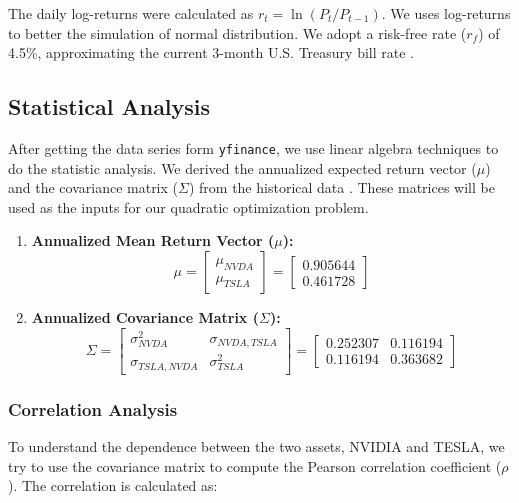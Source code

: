 \documentclass[12pt]{article}
\begin{document}
The daily log-returns were calculated as $r_t = \ln(P_t / P_{t-1})$. We uses log-returns to better the simulation of normal distribution. We adopt a risk-free rate ($r_f$) of 4.5\%, approximating the current 3-month U.S. Treasury bill rate \cite{treasury2025}.

\subsection{Statistical Analysis}
After getting the data series form \texttt{yfinance}, we use linear algebra techniques to do the statistic analysis. We derived the annualized expected return vector ($\mu$) and the covariance matrix ($\Sigma$) from the historical data \cite{strang2016}. These matrices will be used as the inputs for our quadratic optimization problem.

\begin{enumerate}
    \item \textbf{Annualized Mean Return Vector ($\mu$):}
    \[
    \mu = 
    \begin{bmatrix}
    \mu_{NVDA} \\
    \mu_{TSLA}
    \end{bmatrix}
    =
    \begin{bmatrix}
    0.905644 \\
    0.461728
    \end{bmatrix}
    \]

    \item \textbf{Annualized Covariance Matrix ($\Sigma$):}
    \[
    \Sigma = 
    \begin{bmatrix}
    \sigma^2_{NVDA} & \sigma_{NVDA, TSLA} \\
    \sigma_{TSLA, NVDA} & \sigma^2_{TSLA}
    \end{bmatrix}
    =
    \begin{bmatrix}
   
    0.252307 & 0.116194 \\

    0.116194 & 0.363682
    \end{bmatrix}
    \]
\end{enumerate}


\subsubsection{Correlation Analysis}

To understand the dependence between the two assets, NVIDIA and TESLA, we try to use the covariance matrix to compute the Pearson correlation coefficient ($\rho$)\cite{sharpe1964}. The correlation is calculated as:
\end{document}
